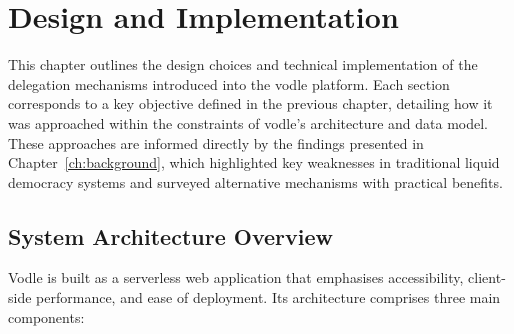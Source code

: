 \chapter{Design and Implementation}
\label{ch:design_implementation}

This chapter outlines the design choices and technical implementation of the delegation mechanisms introduced into the vodle platform. Each section corresponds to a key objective defined in the previous chapter, detailing how it was approached within the constraints of vodle's architecture and data model. These approaches are informed directly by the findings presented in Chapter~\ref{ch:background}, which highlighted key weaknesses in traditional liquid democracy systems and surveyed alternative mechanisms with practical benefits.

\section{System Architecture Overview}
Vodle is built as a serverless web application that emphasises accessibility, client-side performance, and ease of deployment. Its architecture comprises three main components:

